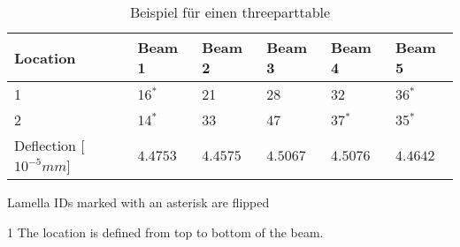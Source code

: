 \begin{table}[htpb]
  \centering
  \caption{Beispiel für einen threeparttable}
  \label{tab:near_optimal}
  \begin{threeparttable}
    \begin{tabular}{@{}l|lllll@{}}\toprule
      Location\tnote{1}             & Beam 1    & Beam 2    & Beam 3    & Beam 4    & Beam 5    \\ \midrule
      1                             & 16$^\ast$ & 21        & 28        & 32        & 36$^\ast$ \\
      2                             & 14$^\ast$ & 33        & 47        & 37$^\ast$ & 35$^\ast$ \\ \midrule
      Deflection [$10^{-5}\si{mm}$] & $4.4753$  & $4.4575$  & $4.5067$  & $4.5076$  & $4.4642$  \\
    \bottomrule\end{tabular}
    \begin{tablenotes}
    \item[] Lamella IDs marked with an asterisk are flipped
    \item[1] The location is defined from top to bottom of the beam.
    \end{tablenotes}
  \end{threeparttable}
\end{table}



